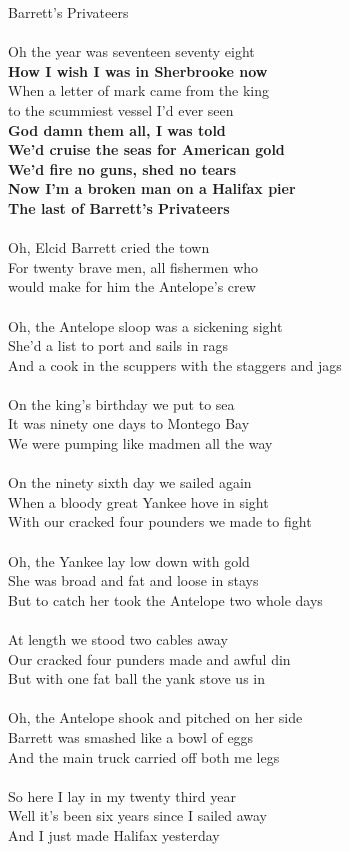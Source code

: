 \documentclass[letterpaper,9pt]{article}
\begin{document}
\newpage
{}
\huge
Barrett's Privateers\\
\\
\large
\noindent
Oh the year was seventeen seventy eight
\\\textbf{How I wish I was in Sherbrooke now}
\\When a letter of mark came from the king
\\to the scummiest vessel I'd ever seen
\\\textbf{God damn them all, I was told
\\We'd cruise the seas for American gold
\\We'd fire no guns, shed no tears
\\Now I'm a broken man on a Halifax pier
\\The last of Barrett's Privateers}
\\
\\Oh, Elcid Barrett cried the town
\\For twenty brave men, all fishermen who
\\would make for him the Antelope's crew
\\
\\Oh, the Antelope sloop was a sickening sight
\\She'd a list to port and sails in rags
\\And a cook in the scuppers with the staggers and jags
\\
\\On the king's birthday we put to sea
\\It was ninety one days to Montego Bay
\\We were pumping like madmen all the way
\\
\\On the ninety sixth day we sailed again
\\When a bloody great Yankee hove in sight
\\With our cracked four pounders we made to fight
\\
\\Oh, the Yankee lay low down with gold
\\She was broad and fat and loose in stays
\\But to catch her took the Antelope two whole days
\\
\\At length we stood two cables away
\\Our cracked four punders made and awful din
\\But with one fat ball the yank stove us in
\\
\\Oh, the Antelope shook and pitched on her side
\\Barrett was smashed like a bowl of eggs
\\And the main truck carried off both me legs
\\
\\So here I lay in my twenty third year
\\Well it's been six years since I sailed away
\\And I just made Halifax yesterday
\end{document}
